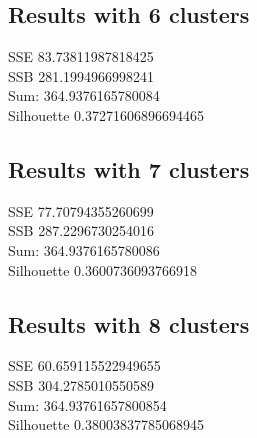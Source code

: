 \documentclass[11pt,a4paper]{article}
\begin{document}
\subsection{Results with 6 clusters}
SSE 83.73811987818425 \\
SSB 281.1994966998241 \\
Sum: 364.9376165780084 \\
Silhouette 0.37271606896694465 \\

\subsection{Results with 7 clusters}
SSE 77.70794355260699 \\
SSB 287.2296730254016 \\
Sum: 364.9376165780086 \\
Silhouette 0.3600736093766918 \\

\subsection{Results with 8 clusters}
SSE 60.659115522949655 \\
SSB 304.2785010550589 \\
Sum: 364.93761657800854 \\
Silhouette 0.38003837785068945 \\
\end{document}
